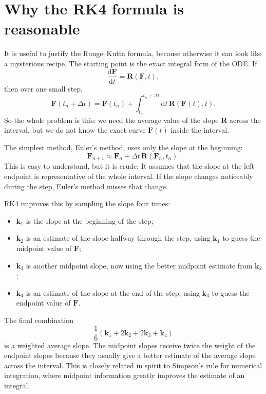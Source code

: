 \documentclass[11pt]{article}
\newcommand{\dd}{\mathrm{d}}
\begin{document}
\section{Why the RK4 formula is reasonable}

It is useful to justify the Runge--Kutta formula, because otherwise it can look
like a mysterious recipe.  The starting point is the exact integral form of the
ODE.  If
\[
  \frac{\dd \mathbf{F}}{\dd t} = \mathbf{R}(\mathbf{F},t),
\]
then over one small step,
\[
  \mathbf{F}(t_n+\Delta t)
  =
  \mathbf{F}(t_n)
  +
  \int_{t_n}^{t_n+\Delta t}
  \dd t\,
  \mathbf{R}(\mathbf{F}(t),t).
\]
So the whole problem is this: we need the average value of the slope
\(\mathbf{R}\) across the interval, but we do not know the exact curve
\(\mathbf{F}(t)\) inside the interval.

The simplest method, Euler's method, uses only the slope at the beginning:
\[
  \mathbf{F}_{n+1}
  \approx
  \mathbf{F}_n
  +
  \Delta t\,\mathbf{R}(\mathbf{F}_n,t_n).
\]
This is easy to understand, but it is crude.  It assumes that the slope at the
left endpoint is representative of the whole interval.  If the slope changes
noticeably during the step, Euler's method misses that change.

RK4 improves this by sampling the slope four times:
\begin{itemize}
  \item \(\mathbf{k}_1\) is the slope at the beginning of the step;
  \item \(\mathbf{k}_2\) is an estimate of the slope halfway through the step,
        using \(\mathbf{k}_1\) to guess the midpoint value of \(\mathbf{F}\);
  \item \(\mathbf{k}_3\) is another midpoint slope, now using the better
        midpoint estimate from \(\mathbf{k}_2\);
  \item \(\mathbf{k}_4\) is an estimate of the slope at the end of the step,
        using \(\mathbf{k}_3\) to guess the endpoint value of \(\mathbf{F}\).
\end{itemize}
The final combination
\[
  \frac{1}{6}
  \left(
  \mathbf{k}_1
  +2\mathbf{k}_2
  +2\mathbf{k}_3
  +\mathbf{k}_4
  \right)
\]
is a weighted average slope.  The midpoint slopes receive twice the weight of
the endpoint slopes because they usually give a better estimate of the average
slope across the interval.  This is closely related in spirit to Simpson's rule
for numerical integration, where midpoint information greatly improves the
estimate of an integral.
\end{document}
